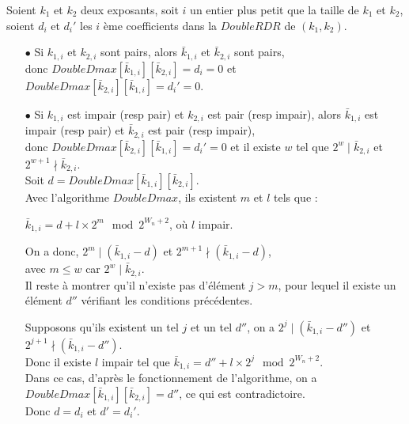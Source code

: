 \documentclass[12pt, a4paper]{memoir}
\begin{document}
  \begin{Preuve}
   Soient $k_1$ et $k_2$ deux exposants, soit $i$ un entier plus petit que la taille de $k_1$ et $k_2$, 
   soient $d_i$ et $d_i'$ les $i$ ème coefficients dans la $DoubleRDR$ de $(k_1,k_2)$.
   \begin{itemize}
   \item [$\bullet$] Si $k_{1,i}$ et $k_{2,i}$ sont pairs, alors $\bar{k}_{1,i}$ et $\bar{k}_{2,i}$ sont pairs, \\
   donc $DoubleDmax[\bar{k}_{1,i}][\bar{k}_{2,i}] = d_i = 0$  et \\
   $DoubleDmax[\bar{k}_{2,i}][\bar{k}_{1,i}] = d_i' = 0$.
   
   \item [$\bullet$] Si $k_{1,i}$ est impair (resp pair) et $k_{2,i}$ est pair (resp impair), alors $\bar{k}_{1,i}$ est 
   impair (resp pair) et $\bar{k}_{2,i}$ est pair (resp impair), \\
   donc $DoubleDmax[\bar{k}_{2,i}][\bar{k}_{1,i}] = d_i' = 0$ et il existe $w$ tel que 
   $2^w \mid \bar{k}_{2,i}$ et $2^{w+1} \nmid \bar{k}_{2,i}$. \\
   Soit $d = DoubleDmax[\bar{k}_{1,i}][\bar{k}_{2,i}]$. \\
   Avec l'algorithme $DoubleDmax$, ils existent $m$ et $l$ tels que :
   \begin{center}
   $\bar{k}_{1,i} = d + l \times 2^m \mod 2^{W_n+2}$, où $l$ impair.    
   \end{center}
   On a donc, $2^m \mid (\bar{k}_{1,i} - d)$ et $2^{m+1} \nmid (\bar{k}_{1,i} - d)$, \\
   avec $m \leq w$ car $2^w \mid \bar{k}_{2,i}$. \\
   Il reste à montrer qu'il n'existe pas d'élément $j>m$, pour lequel il existe un élément $d''$ vérifiant les 
   conditions précédentes.
   
   Supposons qu'ils existent un tel $j$ et un tel $d''$, on a 
   $2^j \mid (\bar{k}_{1,i} - d'')$ et $2^{j+1} \nmid (\bar{k}_{1,i} - d'')$. \\
   Donc il existe $l$ impair tel que $\bar{k}_{1,i} = d'' + l \times 2^j \mod 2^{W_n+2}$. \\
   Dans ce cas, d'après le fonctionnement de l'algorithme, on a $DoubleDmax[\bar{k}_{1,i}][\bar{k}_{2,i}] = d''$,
   ce qui est contradictoire. \\
   Donc $d = d_i$ et $d' = d_i'$.
   

\end{itemize}
\end{Preuve}
\end{document}
